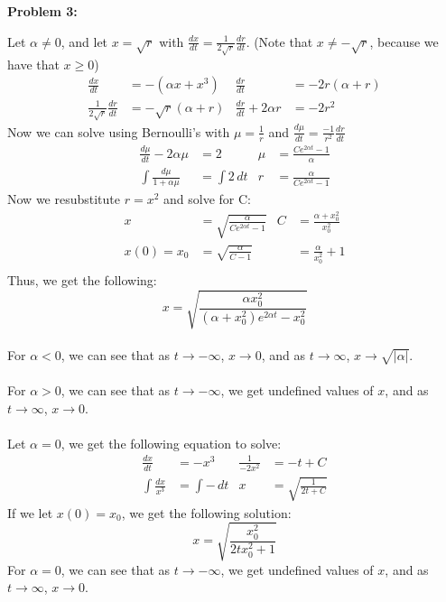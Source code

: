 \documentclass[11pt]{article}
\newenvironment{problem}[1]{\textbf{Problem #1: }}{\newpage}
\begin{document}
\begin{problem}{3}
\begin{enumerate}[label = (\alph*)]
		\end{enumerate}
		\newpage
		Let $\alpha \not= 0$, and let $x = \sqrt{r}$ with $\frac{dx}{dt} = \frac{1}{2 \sqrt{r}}\frac{dr}{dt}$. (Note that $x \not = -\sqrt{r}$, because we have that $x \geq 0$)
		\begin{align*}
			\frac{dx}{dt} &= -(\alpha x + x^3) & \frac{dr}{dt} &= -2r(\alpha + r ) \\
			\frac{1}{2 \sqrt{r}}\frac{dr}{dt} &= -\sqrt{r}(\alpha + r) & \frac{dr}{dt} + 2\alpha r&= -2r^2
		\end{align*}
		Now we can solve using Bernoulli's with $\mu = \frac{1}{r}$ and $\frac{d\mu}{dt} = \frac{-1}{r^2}\frac{dr}{dt}$
		\begin{align*}
			\frac{d\mu}{dt} - 2\alpha \mu &= 2 & \mu &= \frac{Ce^{2\alpha t} - 1}{\alpha}\\
			\int \frac{d\mu}{1 + \alpha\mu} &= \int 2\,dt & r &= \frac{\alpha}{Ce^{2\alpha t} - 1}
		\end{align*}
		Now we resubstitute $r = x^2$ and solve for C:
		\begin{align*}
			x &= \sqrt{\frac{\alpha}{Ce^{2\alpha t} - 1}} & C &= \frac{\alpha + x_0^2}{x_0^2} \\
			x(0) = x_0 &= \sqrt{\frac{\alpha}{C - 1}} & &= \frac{\alpha}{x_0^2} + 1\\
		\end{align*}
		Thus, we get the following:
			$$x = \sqrt{\frac{\alpha x_0^2}{(\alpha + x_0^2) e^{2\alpha t} - x_0^2}}$$
		\\
		For $\alpha < 0$, we can see that as $t \rightarrow -\infty$, $x \rightarrow 0$, and as $t \rightarrow \infty$, $x \rightarrow \sqrt{|\alpha|}$. 
		\\ \\ 
		For $\alpha > 0$, we can see that as $t \rightarrow -\infty$, we get undefined values of $x$, and as $t \rightarrow \infty$, $x \rightarrow 0$. 
		\\ \\ 
		\newpage 
		Let $\alpha = 0$, we get the following equation to solve:
		\begin{align*}
			\frac{dx}{dt} &= -x^3 & \frac{1}{-2x^2} &= -t + C \\
			\int \frac{dx}{x^3} &= \int -\,dt & x &= \sqrt{\frac{1}{2t + C}}
		\end{align*}
		If we let $x(0) = x_0$, we get the following solution:
		$$x = \sqrt{\frac{x_0^2}{2tx_0^2 + 1} }$$
		For $\alpha = 0$, we can see that as $t \rightarrow -\infty$, we get undefined values of $x$, and as $t \rightarrow \infty$, $x \rightarrow 0$.
	\end{problem}
	
\end{document}
